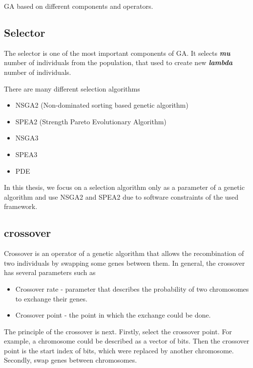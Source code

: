 GA based on different components and operators.

\subsection{Selector}\label{sec:GeneticAlgorithm:Selector}

The selector is one of the most important components of GA. It selects \textit{\textbf{mu}} number of individuals from the population, that used to create new \textit{\textbf{lambda}} number of individuals.

There are many different selection algorithms

\begin{itemize}
	\item NSGA2 (Non-dominated sorting based genetic algorithm)
	\item SPEA2 (Strength Pareto Evolutionary Algorithm)
	\item NSGA3
	\item SPEA3
	\item PDE 
\end{itemize}

In this thesis, we focus on a selection algorithm only as a parameter of a genetic algorithm and use NSGA2 and SPEA2 due to software constraints of the used framework. 

\subsection{crossover}\label{sec:GeneticAlgorithmCrossover}

Crossover is an operator of a genetic algorithm that allows the recombination of two individuals by swapping some genes between them.
In general, the crossover has several parameters such as

\begin{itemize}
	\item Crossover rate - parameter that describes the probability of two chromosomes to exchange their genes.
	\item Crossover point - the point in which the exchange could be done.
\end{itemize}

The principle of the crossover is next.
Firstly, select the crossover point. For example, a chromosome could be described as a vector of bits. Then the crossover point is the start index of bits, which were replaced by another chromosome.
Secondly, swap genes between chromosomes.

